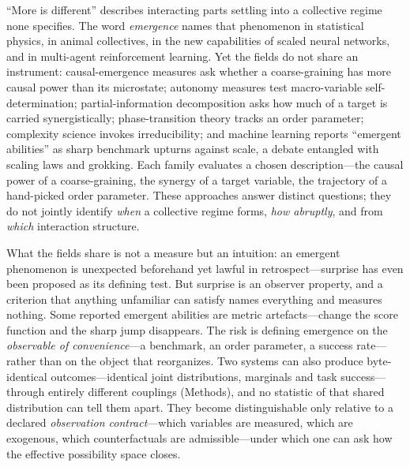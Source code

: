 \documentclass[11pt]{article}
\begin{document}
``More is different'' describes interacting parts settling into a
collective regime none specifies\citep{anderson1972more,bedau1997weak}.
The word \emph{emergence} names that phenomenon in statistical
physics\citep{stanley1971introduction}, in animal
collectives\citep{camazine2001self,couzin2005effective,sumpter2006principles},
in the new capabilities of scaled neural
networks\citep{wei2022emergent}, and in multi-agent
reinforcement
learning\citep{baker2020emergent,leibo2017multi,jaderberg2019human}.
Yet the fields do not share an instrument: causal-emergence measures
ask whether a coarse-graining has more causal power than its
microstate\citep{hoel2013quantifying,hoel2017map,rosas2020reconciling};
autonomy measures test macro-variable
self-determination\citep{seth2010measuring};
partial-information decomposition asks how much of a target is carried
synergistically\citep{williams2010nonnegative,mediano2022greater};
phase-transition theory tracks an order
parameter\citep{strogatz2000kuramoto}; complexity science invokes
irreducibility\citep{crutchfield1994calculi,mitchell2009complexity};
and machine learning reports ``emergent abilities'' as sharp benchmark
upturns against
scale\citep{wei2022emergent,ganguli2022predictability},
a debate entangled with scaling
laws\citep{hoffmann2022training} and
grokking\citep{nanda2023progress}. Each family
evaluates a chosen description---the causal power of a
coarse-graining, the synergy of a target variable, the trajectory of a
hand-picked order parameter. These approaches answer distinct
questions; they do not jointly identify \emph{when} a collective
regime forms, \emph{how abruptly}, and from \emph{which} interaction
structure.

What the fields share is not a measure but an intuition: an emergent
phenomenon is unexpected beforehand yet lawful in
retrospect---surprise has even been proposed as its defining
test\citep{ronald1999design}. But surprise is an observer property,
and a criterion that anything unfamiliar can satisfy names everything
and measures nothing. Some reported emergent abilities are metric
artefacts---change the score function and the
sharp jump disappears\citep{schaeffer2023emergent}. The risk is defining
emergence on the \emph{observable of convenience}---a
benchmark, an order parameter, a success rate---rather than on the
object that reorganizes. Two systems can also produce
byte-identical outcomes---identical joint distributions, marginals
and task success---through entirely different couplings (Methods),
and no statistic of that shared distribution can tell them apart.
They become distinguishable only relative to a declared
\emph{observation contract}---which variables are measured, which are
exogenous, which counterfactuals are admissible---under which one can
ask how the effective possibility space closes.
\end{document}
